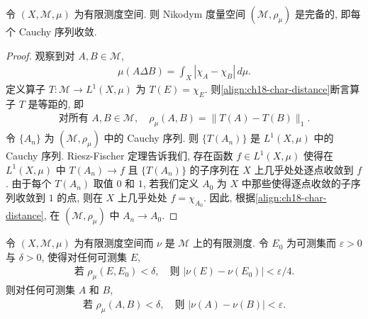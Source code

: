 \documentclass[../../main.tex]{subfiles}
\begin{document}
\begin{theorem}\label{theorem:ch18-nikodym-complete}
令 $(X,\mathcal{M},\mu)$ 为有限测度空间. 则 Nikodym 度量空间 $(\mathcal{M},\rho_{\mu})$ 是完备的, 即每个 Cauchy 序列收敛.
\end{theorem}

\begin{proof}
观察到对 $A,B\in\mathcal{M}$,
\begin{align}
\mu(A\Delta B)=\int_{X}|\chi_{A}-\chi_{B}|\,d\mu.\label{align:ch18-char-distance}
\end{align}
定义算子 $T:\mathcal{M}\to L^{1}(X,\mu)$ 为 $T(E)=\chi_{E}$. 则\eqref{align:ch18-char-distance}断言算子 $T$ 是等距的, 即
\begin{align}
\text{对所有 }A,B\in\mathcal{M},\quad\rho_{\mu}(A,B)=\|T(A)-T(B)\|_{1}.\label{align:ch18-isometry}
\end{align}
令 $\{A_{n}\}$ 为 $(\mathcal{M},\rho_{\mu})$ 中的 Cauchy 序列. 则 $\{T(A_{n})\}$ 是 $L^{1}(X,\mu)$ 中的 Cauchy 序列. Riesz-Fischer 定理告诉我们, 存在函数 $f\in L^{1}(X,\mu)$ 使得在 $L^{1}(X,\mu)$ 中 $T(A_{n})\to f$ 且 $\{T(A_{n})\}$ 的子序列在 $X$ 上几乎处处逐点收敛到 $f$. 由于每个 $T(A_{n})$ 取值 $0$ 和 $1$, 若我们定义 $A_{0}$ 为 $X$ 中那些使得逐点收敛的子序列收敛到 $1$ 的点, 则在 $X$ 上几乎处处 $f=\chi_{A_{0}}$. 因此, 根据\eqref{align:ch18-char-distance}, 在 $(\mathcal{M},\rho_{\mu})$ 中 $A_{n}\to A_{0}$.
\end{proof}

\begin{lemma}\label{lemma:ch18-absolute-continuity-uniform}
令 $(X,\mathcal{M},\mu)$ 为有限测度空间而 $\nu$ 是 $\mathcal{M}$ 上的有限测度. 令 $E_{0}$ 为可测集而 $\varepsilon>0$ 与 $\delta>0$, 使得对任何可测集 $E$,
\begin{align}
\text{若 }\rho_{\mu}(E,E_{0})<\delta,\quad\text{则 }|\nu(E)-\nu(E_{0})|<\varepsilon/4.\label{align:ch18-lemma-proof1}
\end{align}
则对任何可测集 $A$ 和 $B$,
\begin{align}
\text{若 }\rho_{\mu}(A,B)<\delta,\quad\text{则 }|\nu(A)-\nu(B)|<\varepsilon.\label{align:ch18-lemma-proof2}
\end{align}
\end{lemma}
\end{document}
